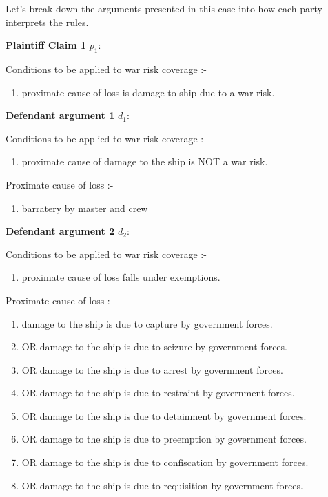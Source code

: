     Let's break down the arguments presented in this case into how each party interprets the rules.
     
     \textbf{Plaintiff Claim 1} $p_1$:
     
     Conditions to be applied to war risk coverage :-
     
     \begin{enumerate}
         \item proximate cause of loss is damage to ship due to a war risk.
     \end{enumerate}
                
     \textbf{Defendant argument 1} $d_1$:
     
     Conditions to be applied to war risk coverage :-
     
     \begin{enumerate}
         \item proximate cause of damage to the ship is NOT a war risk.
     \end{enumerate}
    
     Proximate cause of loss :- 
     
     \begin{enumerate}
         \item barratery by master and crew
     \end{enumerate}
    
                
     \textbf{Defendant argument 2} $d_2$:
     
     Conditions to be applied to war risk coverage :-
     
     \begin{enumerate}
         \item proximate cause of loss falls under exemptions.
     \end{enumerate}
                
     
     Proximate cause of loss :-
     
     \begin{enumerate}
        \item damage to the ship is due to capture by government forces.
        \item OR damage to the ship is due to seizure by government forces.
        \item OR damage to the ship is due to arrest by government forces.
        \item OR damage to the ship is due to restraint by government forces.
        \item OR damage to the ship is due to detainment by government forces.
        \item OR damage to the ship is due to preemption by government forces.
        \item OR damage to the ship is due to confiscation by government forces.
        \item OR damage to the ship is due to requisition by government forces.
     \end{enumerate}
                
